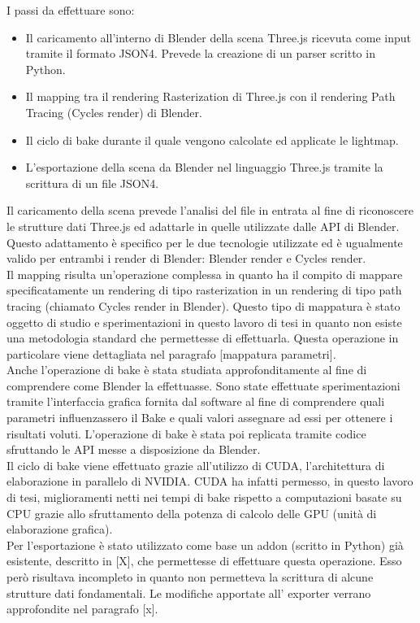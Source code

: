 I passi da effettuare sono:
\begin{itemize}
\item Il caricamento all’interno di Blender della scena Three.js ricevuta come input tramite il formato JSON4. Prevede la creazione di un parser scritto in Python.
\item Il mapping tra il rendering Rasterization di Three.js con il rendering Path Tracing (Cycles render) di Blender.
\item Il ciclo di bake durante il quale vengono calcolate ed applicate le lightmap.
\item L’esportazione della scena da Blender nel linguaggio Three.js tramite la scrittura di un file JSON4.
\end{itemize}

Il caricamento della scena prevede l’analisi del file in entrata al fine di riconoscere le strutture dati Three.js ed adattarle in quelle utilizzate dalle API di Blender.
Questo adattamento è specifico per le due tecnologie utilizzate ed è ugualmente valido per entrambi i render di Blender: Blender render e Cycles render.
\\
Il mapping risulta un’operazione complessa in quanto ha il compito di mappare specificatamente un rendering di tipo rasterization in un rendering di tipo path tracing (chiamato Cycles render in Blender).
Questo tipo di mappatura è stato oggetto di studio e sperimentazioni in questo lavoro di tesi in quanto non esiste una metodologia standard che permettesse di effettuarla. Questa operazione in particolare viene dettagliata nel paragrafo [mappatura parametri].
\\
Anche l’operazione di bake è stata studiata approfonditamente al fine di comprendere come Blender la effettuasse. Sono state effettuate sperimentazioni tramite l’interfaccia grafica fornita dal software al fine di comprendere quali parametri influenzassero il Bake e quali valori assegnare ad essi per ottenere i risultati voluti. L’operazione di bake è stata poi replicata tramite codice sfruttando le API messe a disposizione da Blender.
\\
Il ciclo di bake viene effettuato grazie all’utilizzo di CUDA, l'architettura di elaborazione in parallelo di NVIDIA. 
CUDA ha infatti permesso, in questo lavoro di tesi, miglioramenti netti nei tempi di bake rispetto a computazioni basate su CPU grazie allo sfruttamento della potenza di calcolo delle GPU (unità di elaborazione grafica).
\\
Per l’esportazione è stato utilizzato come base un addon (scritto in Python) già esistente, descritto in [X], che permettesse di effettuare questa operazione. Esso però risultava incompleto in quanto non permetteva la scrittura di alcune strutture dati fondamentali. Le modifiche apportate all’ exporter verrano approfondite nel paragrafo [x].

